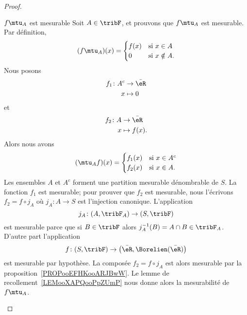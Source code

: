 \begin{proof}
\begin{subproof}
\begin{subproof}
        \item[\( f\mtu_A\) est mesurable]
            Soit \( A\in \tribF\), et prouvons que \( f\mtu_A\) est mesurable. Par définition,
            \begin{equation}
                (f\mtu_A)(x)=\begin{cases}
                    f(x)  &   \text{si } x\in A             \\
                    0     &   \text{si } x\notin A.
                \end{cases}
            \end{equation}
            Nous posons \begin{equation}
                \begin{aligned}
                    f_1\colon A^c & \to \bar \eR  \\
                              x   & \mapsto 0
                \end{aligned}
            \end{equation}
            et
            \begin{equation}
                \begin{aligned}
                    f_2\colon A & \to \bar \eR    \\
                              x & \mapsto f(x).
                \end{aligned}
            \end{equation}
            Alors nous avons
            \begin{equation}
                (\mtu_Af)(x)=\begin{cases}
                    f_1(x)    &   \text{si } x\in A^c       \\
                    f_2(x)    &   \text{si } x\in  A.
                \end{cases}
            \end{equation}
            Les ensembles \( A\) et \( A^c\) forment une partition mesurable dénombrable de \( S\). La fonction \( f_1\) est mesurable; pour prouver que \( f_2\) est mesurable, nous l'écrivons \( f_2=f\circ j_A\) où \( j_A\colon A\to S\) est l'injection canonique. L'application
            \begin{equation}
                j_A\colon (A,\tribF_A)\to (S,\tribF)
            \end{equation}
            est mesurable parce que si \( B\in\tribF\) alors \( j_A^{-1}(B)=A\cap B\in\tribF_A\). D'autre part l'application
            \begin{equation}
                f\colon (S,\tribF)\to \big( \bar \eR,\Borelien(\bar \eR) \big)
            \end{equation}
            est mesurable par hypothèse. La composée \( f_2=f\circ j_A\) est alors mesurable par la proposition~\ref{PROPooEFHKooARJBwW}. Le lemme de recollement~\ref{LEMooXAPQooPpZUmP} nous donne alors la mesurabilité de \( f\mtu_A\).


\end{subproof}
\end{subproof}
\end{proof}
